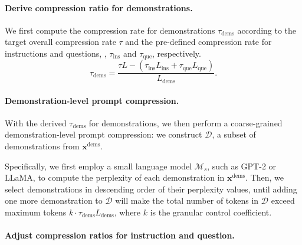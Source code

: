 \paragraph{Derive compression ratio for demonstrations.}
We first compute the compression rate for demonstrations $\tau_{\text{dems}}$ according to the target overall compression rate $\tau$ and the pre-defined compression rate for instructions and questions, \ie, $\tau_{\text{ins}}$ and $\tau_{\text{que}}$, respectively.
\begin{equation}
    \tau_{\text{dems}} = \frac{\tau L - (\tau_{\text{ins}} L_{\text{ins}} + \tau_{\text{que}} L_{\text{que}})}{L_{\text{dems}}}.
    \label{eq:target_token_demonstrate}
\end{equation}


\paragraph{Demonstration-level prompt compression.}
With the derived $\tau_{\text{dems}}$ for demonstrations, we then perform a coarse-grained demonstration-level prompt compression: we construct $\mathcal{D}$, a subset of demonstrations from $\bm{x}^{\text{dems}}$.

Specifically, we first employ a small language model $\mathcal{M}_s$, such as GPT-2 or LLaMA, to compute the perplexity of each demonstration in $\bm{x}^{\text{dems}}$.
Then, we select demonstrations in descending order of their perplexity values, until adding one more demonstration to $\mathcal{D}$ will make the total number of tokens in $\mathcal{D}$ exceed maximum tokens $k\cdot \tau_{\text{dems}}L_{\text{dems}}$,  where $k$ is the granular control coefficient.

\paragraph{Adjust compression ratios for instruction and question.}

